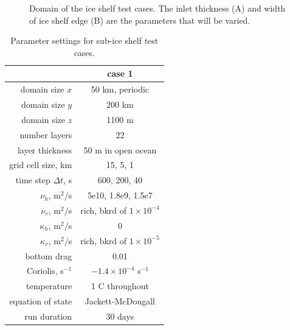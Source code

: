\documentclass[11pt]{report}
\begin{document}
\begin{figure}[tbh]
\caption{Domain of the ice shelf test cases.  The inlet thickness (A) and width of ice shelf edge (B) are the parameters that will be varied.}
\label{figure:ice shelf domain}
\end{figure}


\begin{table}[tbh] 
\caption{Parameter settings for sub-ice shelf test cases.}
\vspace{0.5cm} \centering 
\begin{tabular}{r|c } 
\hline\hline & case 1 \\
\hline 
domain size $x$ &  50 km, periodic \\
domain size $y$ & 200 km\\
domain size $z$ &  1100 m \\
number layers& 22 \\
layer thickness & 50 m in open ocean \\
grid cell size, km  & 15, 5, 1 \\
time step $\Delta t$, s & 600, 200, 40 \\
$\nu_h$, m$^2/$s & 5e10, 1.8e9, 1.5e7 \\
$\nu_v$, m$^2/$s & rich, bkrd of $1\times10^{-4}$ \\
$\kappa_h$, m$^2/$s & 0 \\
$\kappa_v$, m$^2/$s & rich, bkrd of $1\times10^{-5}$ \\
bottom drag & 0.01 \\
Coriolis, s$^{-1}$ & $-1.4\times10^{-4}$ s$^{-1}$ \\
temperature & 1 C throughout \\
equation of state & Jackett-McDougall \\
run duration& 30 days \\
\hline 
\end{tabular} \label{table:ideal test parameters}
\end{table}





\end{document}

